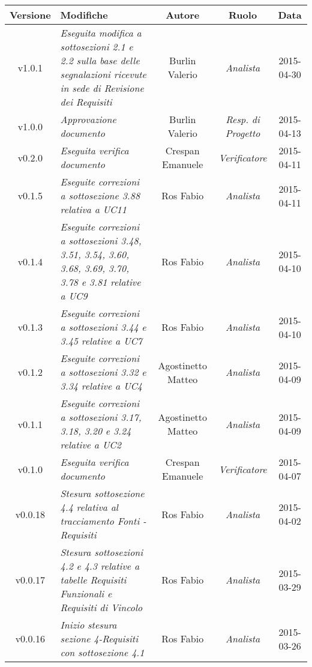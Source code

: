 \begin{table}[h]
\centering
\begin{tabular}{|c|p{}|c|c|c|}
	\toprule
		\textbf{Versione} & \textbf{Modifiche} & \textbf{Autore} & \textbf{Ruolo} & \textbf{Data}\\
	\midrule
	\midrule
		v1.0.1 & \textit{Eseguita modifica a sottosezioni 2.1 e 2.2 sulla base delle segnalazioni ricevute in sede di Revisione dei Requisiti} & Burlin Valerio & \textit{Analista} & 2015-04-30\\
	\midrule
		v1.0.0 & \textit{Approvazione documento} & Burlin Valerio & \textit{Resp. di Progetto} & 2015-04-13\\
	\midrule
		v0.2.0 & \textit{Eseguita verifica documento} & Crespan Emanuele & \textit{Verificatore} & 2015-04-11\\
	\midrule
		v0.1.5 & \textit{Eseguite correzioni a sottosezione 3.88 relativa a UC11} & Ros Fabio & \textit{Analista} & 2015-04-11\\
	\midrule
		v0.1.4 & \textit{Eseguite correzioni a sottosezioni 3.48, 3.51, 3.54, 3.60, 3.68, 3.69, 3.70, 3.78  e 3.81 relative a UC9} & Ros Fabio & \textit{Analista} & 2015-04-10\\
	\midrule
		v0.1.3 & \textit{Eseguite correzioni a sottosezioni 3.44 e 3.45 relative a UC7} & Ros Fabio & \textit{Analista} & 2015-04-10\\
	\midrule
		v0.1.2 & \textit{Eseguite correzioni a sottosezioni 3.32 e 3.34 relative a UC4} & Agostinetto Matteo & \textit{Analista} & 2015-04-09\\
	\midrule
		v0.1.1 & \textit{Eseguite correzioni a sottosezioni 3.17, 3.18, 3.20 e 3.24 relative a UC2} & Agostinetto Matteo & \textit{Analista} & 2015-04-09\\
	\midrule
		v0.1.0 & \textit{Eseguita verifica documento} & Crespan Emanuele & \textit{Verificatore} & 2015-04-07\\
	\midrule
		v0.0.18 & \textit{Stesura sottosezione 4.4 relativa al tracciamento Fonti - Requisiti} & Ros Fabio & \textit{Analista} & 2015-04-02\\
	\midrule
		v0.0.17 & \textit{Stesura sottosezioni 4.2 e 4.3 relative a tabelle Requisiti Funzionali e Requisiti di Vincolo} & Ros Fabio & \textit{Analista} & 2015-03-29\\
	\midrule
		v0.0.16 & \textit{Inizio stesura sezione 4-Requisiti con sottosezione 4.1} & Ros Fabio & \textit{Analista} & 2015-03-26\\
	\bottomrule
\end{tabular}
\end{table}
